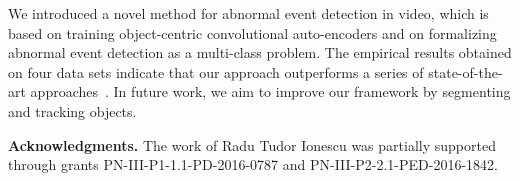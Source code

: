 \documentclass[10pt,twocolumn,letterpaper]{article}
\begin{document}
We introduced a novel method for abnormal event detection in video, which is based on  training object-centric convolutional auto-encoders and on  formalizing abnormal event detection as a multi-class problem. The empirical results obtained on four data sets indicate that our approach outperforms a series of state-of-the-art approaches~\cite{Cong-CVPR-2011,Giorno-ECCV-2016,Dutta-AAAI-2015,Hasan-CVPR-2016,Hinami-ICCV-2017,Ionescu-ICCV-2017,Ionescu-WACV-2019,Kim-CVPR-2009,Liu-CVPR-2018,Liu-BMVC-2018,Lu-ICCV-2013,Luo-ICCV-2017,Mahadevan-CVPR-2010,Mehran-CVPR-2009,Ravanbakhsh-WACV-2018,Ravanbakhsh-ICIP-2017,Sabokrou-IP-2017,Saligrama-CVPR-2012,Smeureanu-ICIAP-2017,Sultani-CVPR-2018,Xu-BMVC-2015,Xu-CVIU-2017,Zhang-PR-2016}. In future work, we aim to improve our framework by segmenting and tracking objects.

\noindent
{\bf Acknowledgments.}
The work of Radu Tudor Ionescu was partially supported through grants PN-III-P1-1.1-PD-2016-0787 and PN-III-P2-2.1-PED-2016-1842.

{\small


}
\end{document}
